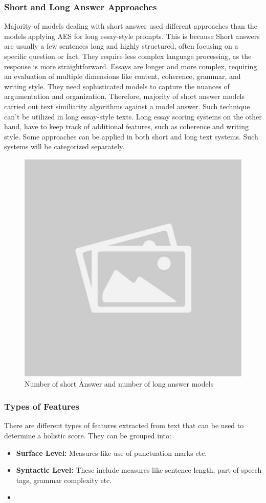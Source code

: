 \documentclass{article}
\begin{document}
\subsubsection*{Short and Long Answer Approaches}
Majority of models dealing with short answer used different approaches than the models applying AES for long essay-style prompts. This is because Short answers are usually a few sentences long and highly structured, often focusing on a specific question or fact. They require less complex language processing, as the response is more straightforward. Essays are longer and more complex, requiring an evaluation of multiple dimensions like content, coherence, grammar, and writing style. They need sophisticated models to capture the nuances of argumentation and organization. Therefore, majority of short answer models carried out text similiarity algorithms against a model answer. Such technique can't be utilized in long essay-style texts. Long essay scoring systems on the other hand, have to keep track of additional features, such as coherence and writing style. Some approaches can be applied in both short and long text systems. Such systems will be categorized separately.
\begin{figure}[H]
    \centering
    \includegraphics[width=0.5\linewidth]{img/placeholder.jpg}
    \caption{Number of short Answer and number of long answer models}
    \label{shortlongcomparison}
\end{figure}
\subsubsection*{Types of Features}
There are different types of features extracted from text that can be used to determine a holistic score. They can be grouped into:
\begin{itemize}
	\item \textbf{Surface Level: } Measures like use of punctuation marks etc.
	\item \textbf{Syntactic Level: } These include measures like sentence length, part-of-speech tags, grammar complexity etc.
	\item 
\end{itemize}
\end{document}

